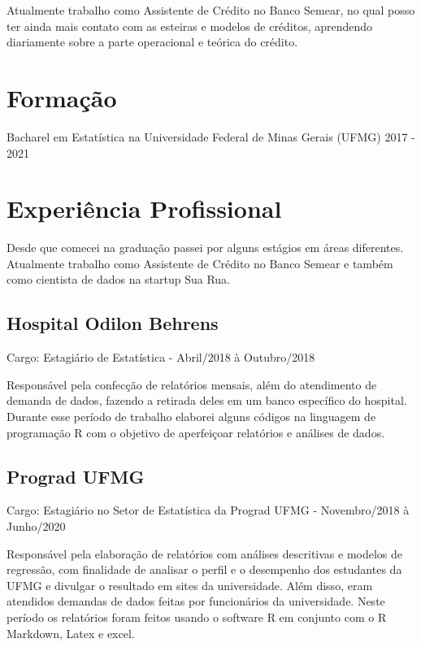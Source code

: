 \documentclass[
]{book}
\begin{document}
Atualmente trabalho como Assistente de Crédito no Banco Semear, no qual posso ter ainda mais contato com as esteiras e modelos de créditos, aprendendo diariamente sobre a parte operacional e teórica do crédito.

\hypertarget{formauxe7uxe3o}{%
\section{Formação}\label{formauxe7uxe3o}}

Bacharel em Estatística na Universidade Federal de Minas Gerais (UFMG) 2017 - 2021

\hypertarget{experiuxeancia-profissional}{%
\section{Experiência Profissional}\label{experiuxeancia-profissional}}

Desde que comecei na graduação passei por alguns estágios em áreas diferentes. Atualmente trabalho como Assistente de Crédito no Banco Semear e também como cientista de dados na startup Sua Rua.

\hypertarget{hospital-odilon-behrens}{%
\subsection{Hospital Odilon Behrens}\label{hospital-odilon-behrens}}

Cargo: Estagiário de Estatística - Abril/2018 à Outubro/2018

Responsável pela confecção de relatórios mensais, além do atendimento de demanda de dados, fazendo a retirada deles em um banco específico do hospital. Durante esse período de trabalho elaborei alguns códigos na linguagem de programação R com o objetivo de aperfeiçoar relatórios e análises de dados.

\hypertarget{prograd-ufmg}{%
\subsection{Prograd UFMG}\label{prograd-ufmg}}

Cargo: Estagiário no Setor de Estatística da Prograd UFMG - Novembro/2018 à Junho/2020

Responsável pela elaboração de relatórios com análises descritivas e modelos de regressão, com finalidade de analisar o perfil e o desempenho dos estudantes da UFMG e divulgar o resultado em sites da universidade. Além disso, eram atendidos demandas de dados feitas por funcionários da universidade. Neste período os relatórios foram feitos usando o software R em conjunto com o R Markdown, Latex e excel.
\end{document}
